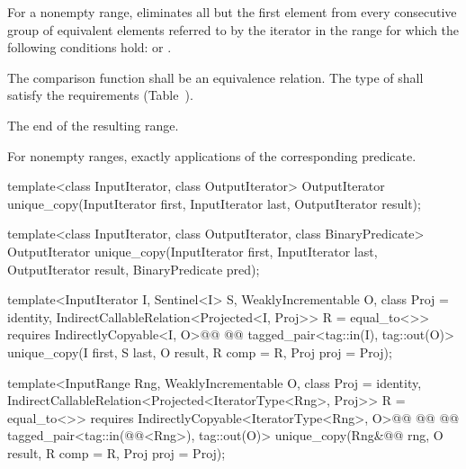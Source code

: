 \begin{itemdescr}
\pnum
\effects
For a nonempty range, eliminates all but the first element from every
consecutive group of equivalent elements referred to by the iterator
in the range
for which the following conditions hold:
or
.

\begin{removedblock}
\pnum
\requires
The comparison function shall be an equivalence relation.
The type of  shall satisfy the
 requirements (Table~).
\end{removedblock}

\pnum
\returns
The end of the resulting range.

\pnum
\complexity
For nonempty ranges, exactly
applications of the corresponding predicate.
\end{itemdescr}

%
\begin{removedblock}
\begin{itemdecl}
template<class InputIterator, class OutputIterator>
  OutputIterator
    unique_copy(InputIterator first, InputIterator last,
                OutputIterator result);

template<class InputIterator, class OutputIterator,
         class BinaryPredicate>
  OutputIterator
    unique_copy(InputIterator first, InputIterator last,
                OutputIterator result, BinaryPredicate pred);
\end{itemdecl}
\end{removedblock}
\begin{addedblock}
\begin{itemdecl}
template<InputIterator I, Sentinel<I> S, WeaklyIncrementable O,
    class Proj = identity, IndirectCallableRelation<Projected<I, Proj>> R = equal_to<>>
  requires IndirectlyCopyable<I, O>@@
    @@
  tagged_pair<tag::in(I), tag::out(O)>
    unique_copy(I first, S last, O result, R comp = R{}, Proj proj = Proj{});

template<InputRange Rng, WeaklyIncrementable O, class Proj = identity,
    IndirectCallableRelation<Projected<IteratorType<Rng>, Proj>> R = equal_to<>>
  requires IndirectlyCopyable<IteratorType<Rng>, O>@\newtxt{() \&\&}@
    @@
     @@
  tagged_pair<tag::in(@@<Rng>), tag::out(O)>
    unique_copy(Rng&@\newtxt{\&}@ rng, O result, R comp = R{}, Proj proj = Proj{});
\end{itemdecl}
\end{addedblock}

